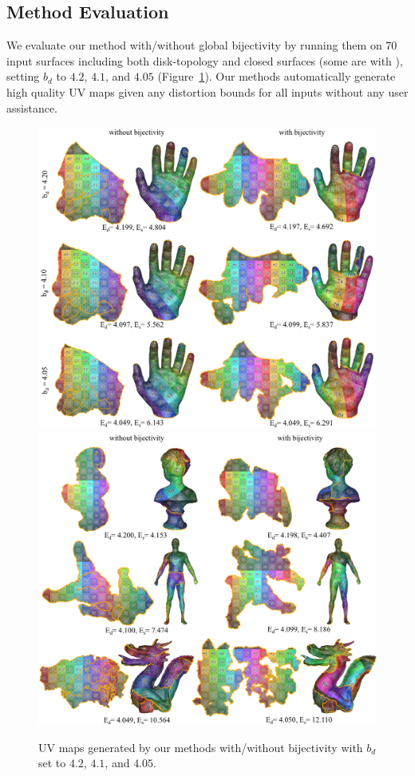 

\subsection{Method Evaluation}

We evaluate our method with/without global bijectivity by running them on 70 input surfaces including both disk-topology and closed surfaces (some are with ), setting $b_d$ to $4.2$, $4.1$, and $4.05$ (Figure~\ref{fig:our_impressive_results}). Our methods automatically generate high quality UV maps given any distortion bounds for all inputs without any user assistance.

\begin{figure}[!h]
\centering
\includegraphics[width=0.48\linewidth]{fig/our_impressive_results_left.png}
\includegraphics[width=0.5\linewidth]{fig/our_impressive_results_right.png}
\caption{UV maps generated by our methods with/without bijectivity with $b_d$ set to $4.2$, $4.1$, and $4.05$.}
\label{fig:our_impressive_results}
\end{figure}

